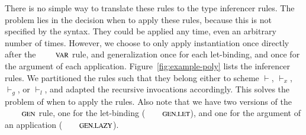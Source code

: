 \documentclass[preprint,natbib]{sigplanconf}
\begin{document}
    There is no simple way to translate these rules to the type
    inferencer rules. The problem lies in the decision when to apply
    these rules, because this is not specified by the syntax. They
    could be applied any time, even an arbitrary number of
    times. However, we choose to only apply instantiation once
    directly after the $\RefTirName{VAR}$ rule, and generalization
    once for each let-binding, and once for the argument of each
    application. Figure~\ref{fig:example-poly} lists the inferencer
    rules. We partitioned the rules such that they belong
    either to scheme $\vdash$, $\vdash_x$, $\vdash_g$, or $\vdash_l$,
    and adapted the recursive invocations accordingly. This solves the
    problem of when to apply the rules.  Also note that we have two
    versions of the $\RefTirName{GEN}$ rule, one for the let-binding
    ($\RefTirName{GEN.LET}$), and one for the argument of an
    application ($\RefTirName{GEN.LAZY}$).
\end{document}
